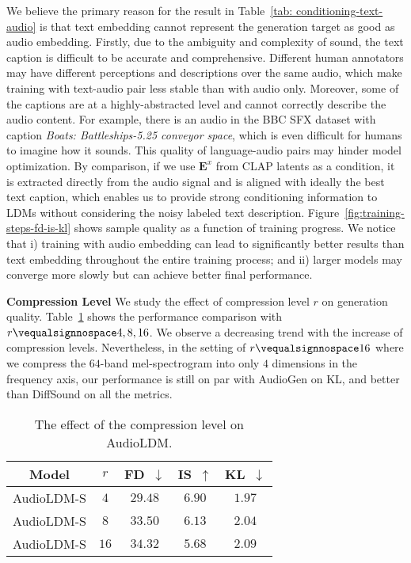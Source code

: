 We believe the primary reason for the result in Table~\ref{tab: conditioning-text-audio} is that text embedding cannot represent the generation target as good as audio embedding. 
Firstly, due to the ambiguity and complexity of sound, the text caption is difficult to be accurate and comprehensive. Different human annotators may have different perceptions and descriptions over the same audio, which make training with text-audio pair less stable than with audio only.
Moreover, some of the captions are at a highly-abstracted level and cannot correctly describe the audio content. For example, there is an audio in the BBC SFX dataset with caption \textit{Boats: Battleships-5.25 conveyor space}, which is even difficult for humans to imagine how it sounds. This quality of language-audio pairs may hinder model optimization. 
By comparison, if we use $\boldsymbol{E}^{x}$ from CLAP latents as a condition, it is extracted directly from the audio signal and is aligned with ideally the best text caption, which enables us to provide strong conditioning information to LDMs without considering the noisy labeled text description.
Figure~\ref{fig:training-steps-fd-is-kl} shows sample quality as a function of training progress. We notice that i) training with audio embedding can lead to significantly better results than text embedding throughout the entire training process; and ii) larger models may converge more slowly but can achieve better final performance.

\textbf{Compression Level} We study the effect of compression level $r$ on generation quality. Table~\ref{tab: compressionratio} shows the performance comparison with $r\vequalsignnospace4,8,16$. We observe a decreasing trend with the increase of compression levels. Nevertheless, in the setting of $r\vequalsignnospace16$ where we compress the $64$-band mel-spectrogram into only $4$ dimensions in the frequency axis, our performance is still on par with AudioGen on KL, and better than DiffSound on all the metrics.

\begin{table}[htbp]
\centering
\small
\begin{tabular}{ccccc}
\toprule
Model         & $r$ & FD~$\downarrow$   & IS~$\uparrow$   & KL~$\downarrow$   \\
\midrule
AudioLDM-S & $4$          & $\mathbf{29.48}$ & $\mathbf{6.90}$ & $\mathbf{1.97}$ \\
AudioLDM-S & $8$          & $33.50$  & $6.13$ & $2.04$ \\
AudioLDM-S & $16$         & $34.32$  & $5.68$ & $2.09$ \\
\bottomrule
\end{tabular}
\caption{The effect of the compression level on AudioLDM.}
\label{tab: compressionratio}
\end{table}

